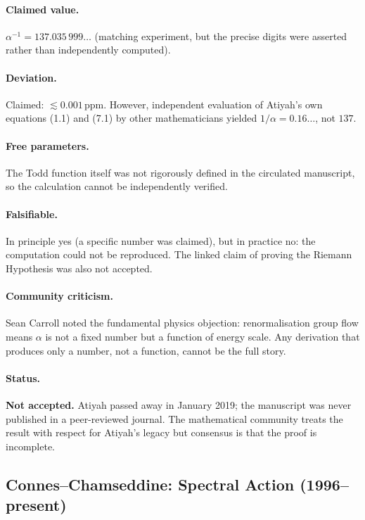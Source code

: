 \documentclass[11pt,a4paper]{article}
\begin{document}
\paragraph{Claimed value.}
$\alpha^{-1} = 137.035\,999\ldots$ (matching experiment, but the precise digits were asserted rather than independently computed).

\paragraph{Deviation.}
Claimed: $\lesssim 0.001$\,ppm.  However, independent evaluation of Atiyah's own equations (1.1) and (7.1) by other mathematicians yielded $1/\alpha = 0.16\ldots$, not $137$.

\paragraph{Free parameters.}
The Todd function itself was not rigorously defined in the circulated manuscript, so the calculation cannot be independently verified.

\paragraph{Falsifiable.}
In principle yes (a specific number was claimed), but in practice no: the computation could not be reproduced.  The linked claim of proving the Riemann Hypothesis was also not accepted.

\paragraph{Community criticism.}
Sean Carroll noted the fundamental physics objection: renormalisation group flow means $\alpha$ is not a fixed number but a function of energy scale.  Any derivation that produces only a number, not a function, cannot be the full story.

\paragraph{Status.}
\textbf{Not accepted.}  Atiyah passed away in January 2019; the manuscript was never published in a peer-reviewed journal.  The mathematical community treats the result with respect for Atiyah's legacy but consensus is that the proof is incomplete.

\subsection{Connes--Chamseddine: Spectral Action (1996--present)}\label{sec:connes}
\end{document}
